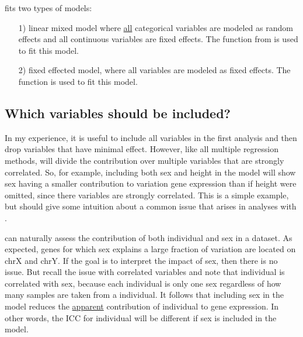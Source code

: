 \documentclass[12pt]{article}\usepackage[]{graphicx}\usepackage[]{xcolor}
\begin{document}

 fits two types of models: 
\begin{itemize}
	\item[1)] linear mixed model where \underline{all} categorical variables are modeled as random effects and all continuous variables are fixed effects.  The function  from  is used to fit this model.

	\item[2)] fixed effected model, where all variables are modeled as fixed effects. The function  is used to fit this model.

\end{itemize}

\subsection{Which variables should be included?}

In my experience, it is useful to include all variables in the first analysis and then drop variables that have minimal effect.  However, like all multiple regression methods,  will divide the contribution over multiple variables that are strongly correlated.  So, for example, including both sex and height in the model will show sex having a smaller contribution to variation gene expression than if height were omitted, since there variables are strongly correlated.  This is a simple example, but should give some intuition about a common issue that arises in analyses with .

 can naturally assess the contribution of both individual and sex in a dataset.  As expected, genes for which sex explains a large fraction of variation are located on chrX and chrY.  If the goal is to interpret the impact of sex, then there is no issue.  But recall the issue with correlated variables and note that individual is correlated with sex, because each individual is only one sex regardless of how many samples are taken from a individual. It follows that including sex in the model reduces the \underline{apparent} contribution of individual to gene expression.  In other words, the ICC for individual will be different if sex is included in the model.
\end{document}
